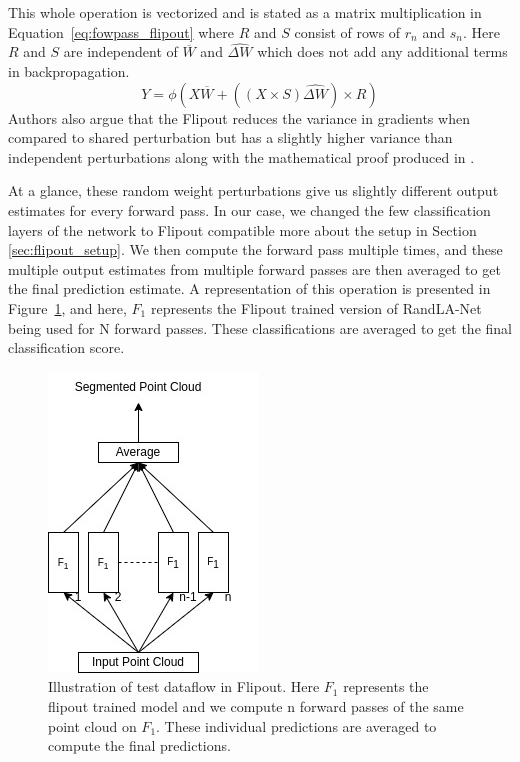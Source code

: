 This whole operation is vectorized and is stated as a matrix multiplication in Equation~\ref{eq:fowpass_flipout} where $R$ and $S$ consist of rows of $r_n$ and $s_n$.
Here $R$ and $S$ are independent of $\overline{W}$ and $\widehat{\Delta W}$ which does not add any additional terms in backpropagation.
\begin{equation}
    Y = \phi(X\overline{W}+((X\times S)\widehat{\Delta W})\times R)
    \label{eq:fowpass_flipout}
\end{equation}
Authors also argue that the Flipout reduces the variance in gradients when compared to shared perturbation but has a slightly higher variance than independent perturbations along with the mathematical proof produced in \cite{Flipout}.


At a glance, these random weight perturbations give us slightly different output estimates for every forward pass.
In our case, we changed the few classification layers of the network to Flipout compatible more about the setup in Section \ref{sec:flipout_setup}.
We then compute the forward pass multiple times, and these multiple output estimates from multiple forward passes are then averaged to get the final prediction estimate.
A representation of this operation is presented in Figure~\ref{fig:flipout_ex}, and here, $F_1$ represents the Flipout trained version of RandLA-Net being used for N forward passes.
These classifications are averaged to get the final classification score.

\begin{figure}
    \centering
    \includegraphics[scale=0.5]{images/flipout.jpg}
    \caption{Illustration of test dataflow in Flipout. Here $F_1$ represents the flipout trained model and we compute n forward passes of the same point cloud on $F_1$.
    These individual predictions are averaged to compute the final predictions.}
    \label{fig:flipout_ex}
\end{figure}
\FloatBarrier

